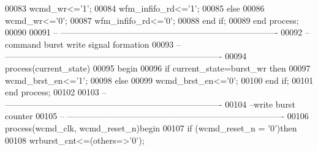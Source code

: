 \begin{DoxyCode}
00083         \textcolor{vhdlchar}{wcmd_wr}\textcolor{vhdlchar}{<=}\textcolor{vhdlchar}{'}\textcolor{vhdllogic}{}\textcolor{vhdllogic}{1}\textcolor{vhdlchar}{'};
00084         \textcolor{vhdlchar}{wfm_infifo_rd}\textcolor{vhdlchar}{<=}\textcolor{vhdlchar}{'}\textcolor{vhdllogic}{}\textcolor{vhdllogic}{1}\textcolor{vhdlchar}{'}; 
00085     \textcolor{keywordflow}{else} 
00086         \textcolor{vhdlchar}{wcmd_wr}\textcolor{vhdlchar}{<=}\textcolor{vhdlchar}{'}\textcolor{vhdllogic}{}\textcolor{vhdllogic}{0}\textcolor{vhdlchar}{'};
00087         \textcolor{vhdlchar}{wfm_infifo_rd}\textcolor{vhdlchar}{<=}\textcolor{vhdlchar}{'}\textcolor{vhdllogic}{}\textcolor{vhdllogic}{0}\textcolor{vhdlchar}{'};
00088     \textcolor{keywordflow}{end} \textcolor{keywordflow}{if};
00089 \textcolor{keywordflow}{end} \textcolor{keywordflow}{process};
00090 
00091 \textcolor{keyword}{-- ----------------------------------------------------------------------------}
00092 \textcolor{keyword}{-- command burst write signal formation}
00093 \textcolor{keyword}{-- ----------------------------------------------------------------------------}
00094 \textcolor{keywordflow}{process}(current_state)
00095 \textcolor{vhdlkeyword}{begin }
00096     \textcolor{keywordflow}{if} \textcolor{vhdlchar}{current_state}\textcolor{vhdlchar}{=}\textcolor{vhdlchar}{burst\_wr} \textcolor{keywordflow}{then} 
00097         \textcolor{vhdlchar}{wcmd_brst_en}\textcolor{vhdlchar}{<=}\textcolor{vhdlchar}{'}\textcolor{vhdllogic}{}\textcolor{vhdllogic}{1}\textcolor{vhdlchar}{'};
00098     \textcolor{keywordflow}{else}
00099         \textcolor{vhdlchar}{wcmd_brst_en}\textcolor{vhdlchar}{<=}\textcolor{vhdlchar}{'}\textcolor{vhdllogic}{}\textcolor{vhdllogic}{0}\textcolor{vhdlchar}{'}; 
00100     \textcolor{keywordflow}{end} \textcolor{keywordflow}{if};
00101 \textcolor{keywordflow}{end} \textcolor{keywordflow}{process};
00102 
00103 \textcolor{keyword}{-- ----------------------------------------------------------------------------}
00104 \textcolor{keyword}{--write burst counter}
00105 \textcolor{keyword}{-- ----------------------------------------------------------------------------}
00106 \textcolor{keywordflow}{process}(wcmd_clk, wcmd_reset_n)\textcolor{keywordflow}{begin}
00107     \textcolor{keywordflow}{if} \textcolor{vhdlchar}{(}\textcolor{vhdlchar}{wcmd_reset_n} \textcolor{vhdlchar}{=} \textcolor{vhdlchar}{'}\textcolor{vhdllogic}{}\textcolor{vhdllogic}{0}\textcolor{vhdlchar}{'}\textcolor{vhdlchar}{)}\textcolor{keywordflow}{then}
00108         \textcolor{vhdlchar}{wrburst_cnt}\textcolor{vhdlchar}{<=}\textcolor{vhdlchar}{(}\textcolor{keywordflow}{others}\textcolor{vhdlchar}{=}\textcolor{vhdlchar}{>}\textcolor{vhdlchar}{'}\textcolor{vhdllogic}{}\textcolor{vhdllogic}{0}\textcolor{vhdlchar}{'}\textcolor{vhdlchar}{)};

\end{DoxyCode}
